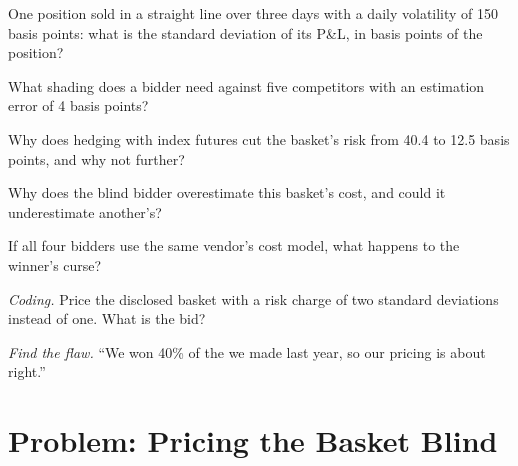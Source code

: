 \begin{exercise}[$\star$]\label{exo:mx:portfolio-trades-and-risk-bids:2}
One position sold in a straight line over three days with a daily volatility of 150 basis points: what is the standard deviation of its P\&L, in
basis points of the position?
\end{exercise}

\begin{exercise}[$\star$]\label{exo:mx:portfolio-trades-and-risk-bids:3}
What shading does a bidder need against five competitors with an estimation error of 4 basis points?
\end{exercise}

\begin{exercise}[$\star\star$]\label{exo:mx:portfolio-trades-and-risk-bids:4}
Why does hedging with index futures cut the basket's risk from 40.4 to 12.5 basis points, and why not further?
\end{exercise}

\begin{exercise}[$\star\star$]\label{exo:mx:portfolio-trades-and-risk-bids:5}
Why does the blind bidder overestimate this basket's cost, and could it underestimate another's?
\end{exercise}

\begin{exercise}[$\star\star$]\label{exo:mx:portfolio-trades-and-risk-bids:6}
If all four bidders use the same vendor's cost model, what happens to the winner's curse?
\end{exercise}

\begin{exercise}[$\star\star\star$]\label{exo:mx:portfolio-trades-and-risk-bids:7}
\emph{Coding.} Price the disclosed basket with a risk charge of two standard deviations instead of one. What is the bid?
\end{exercise}

\begin{exercise}[$\star\star\star$]\label{exo:mx:portfolio-trades-and-risk-bids:8}
\emph{Find the flaw.} ``We won 40\% of the  we made last year, so our pricing is about right.''
\end{exercise}

\section{Problem: Pricing the Basket Blind}

